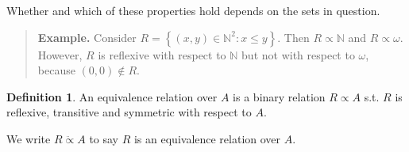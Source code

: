 \documentclass[a4paper, 12pt]{article}
\theoremstyle{definition}
\theoremstyle{definition}
\theoremstyle{definition}
\newtheorem{definition}{Definition}
\begin{document}
Whether and which of these properties hold depends on the sets in question. 


\small
\begin{quote}

\textbf{Example.} Consider $R = \left\{ (x, y) \in  \mathbb{N}^2 : x \leq y
\right\} $. Then $R \propto \mathbb{N}$ and $R \propto \omega$. However, $R$ is
reflexive with respect to $\mathbb{N}$ but not with respect to $\omega$, because
$(0, 0) \not\in R$.

\end{quote}
\normalsize

\begin{definition}
    An equivalence relation over $A$ is a binary relation $R \propto A$ s.t. $R$
    is reflexive, transitive and symmetric with respect to $A$.
\end{definition}

We write $R \ddot{\propto} A$ to say $R$ is an equivalence relation over $A$.
\end{document}
